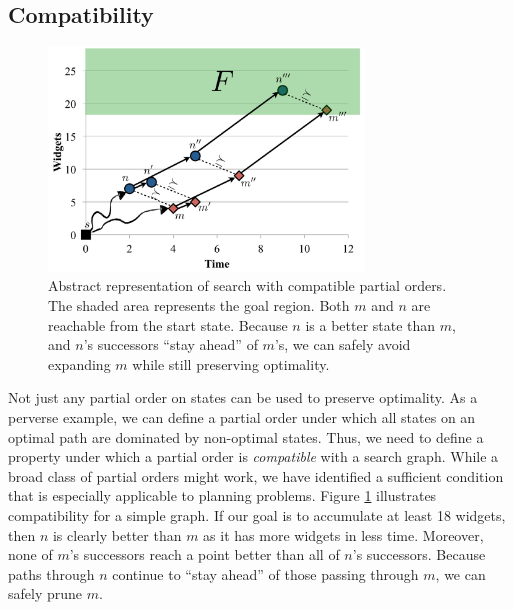 \documentclass[letterpaper]{article}
\theoremstyle{plain} \newtheorem{theorem}{Theorem} \newtheorem{proposition}{Proposition} \newtheorem{lemma}{Lemma}
\theoremstyle{definition} \newtheorem{definition}{Definition} \newtheorem{conjecture}{Conjecture} \newtheorem*{example}{Example}
\theoremstyle{remark} \newtheorem*{remark}{Remark} \newtheorem*{note}{Note} \newtheorem{case}{Case}
\begin{document}
\subsection{Compatibility}
\begin{figure}
	\begin{center}
	\includegraphics[width=3.3in]{compatibility-2.pdf}
  \vspace{-.38in}
\end{center}
  \caption{Abstract representation of search with compatible partial
  orders. The shaded area represents the goal region. Both $m$ and $n$ are reachable from the start state.
  Because $n$ is a better state than $m$, and $n$'s successors
  ``stay ahead'' of $m$'s, we can safely avoid expanding $m$ while
  still preserving optimality.}
  \vspace{-.18in}
  \label{fig:compatibility}
\end{figure}

Not just any partial order on states can be used to preserve optimality. As a perverse
example, we can define a partial order under which all states
on an optimal path
are dominated by non-optimal states. Thus, we need to define a property
under which a partial order is \textit{compatible} with a search graph. 
While a broad class of partial orders might work, we have identified
a sufficient condition that is especially applicable to planning problems.
Figure \ref{fig:compatibility} illustrates 
compatibility for a simple graph. If our goal is to accumulate at
least 18 widgets, then $n$ is clearly better than $m$ as
it has more widgets in less time. Moreover, none
of $m$'s successors reach a point better than all of $n$'s 
successors. Because paths through $n$ continue to
``stay ahead'' of those passing through $m$, we
can safely prune $m$.
\end{document}
